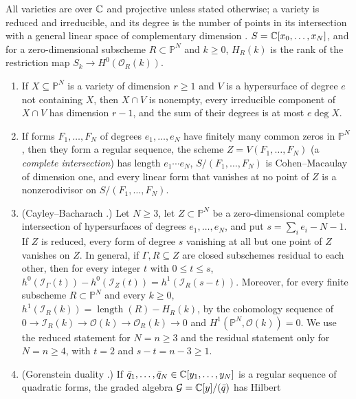 All varieties are over $\mathbb C$ and projective unless stated otherwise; a variety
is reduced and irreducible, and its degree is the number of points in its
intersection with a general linear space of complementary dimension
\cite{Harris1992}. $S=\mathbb C[x_0,\ldots,x_N]$, and for a
zero-dimensional subscheme $R\subset\mathbb P^N$ and $k\ge0$,
$H_R(k)$ is the rank of the restriction map $S_k\to H^0(\mathcal O_R(k))$.
\begin{enumerate}[label=(AG\arabic*)]
\item \cite[Propositions~I.7.1, I.7.2 and Theorem~I.7.7]{Hartshorne1977} If
  $X\subseteq\mathbb P^N$ is a variety of dimension $r\ge1$ and $V$ is a
  hypersurface of degree $e$ not containing $X$, then $X\cap V$ is nonempty,
  every irreducible component of $X\cap V$ has dimension $r-1$, and the sum
  of their degrees is at most $e\deg X$.
\item \cite[Proposition~8.4 and Example~8.4.6]{Fulton1998} If forms
  $F_1,\ldots,F_N$ of degrees $e_1,\ldots,e_N$ have finitely many common zeros
  in $\mathbb P^N$, then they form a regular sequence, the scheme
  $Z=V(F_1,\ldots,F_N)$ (a \emph{complete intersection}) has length
  $e_1\cdots e_N$, $S/(F_1,\ldots,F_N)$ is Cohen--Macaulay of dimension one, and
  every linear form that vanishes at no point of $Z$ is a nonzerodivisor on
  $S/(F_1,\ldots,F_N)$.
\item (Cayley--Bacharach \cite[Theorem~CB7]{EisenbudGreenHarris1996}.)
  Let $N\ge3$, let $Z\subset\mathbb P^N$ be a zero-dimensional complete
  intersection of hypersurfaces of degrees $e_1,\ldots,e_N$, and put
  $s=\sum_ie_i-N-1$. If $Z$ is reduced, every form of degree $s$ vanishing at
  all but one point of $Z$ vanishes on $Z$. In general, if $\Gamma,R\subseteq Z$
  are closed subschemes residual to each other, then for every integer $t$
  with $0\le t\le s$,
  $h^0(\mathcal I_\Gamma(t))-h^0(\mathcal I_Z(t))=h^1(\mathcal I_R(s-t))$.
  Moreover, for every finite subscheme $R\subset\mathbb P^N$ and every
  $k\ge0$, $h^1(\mathcal I_R(k))=\operatorname{length}(R)-H_R(k)$, by the
  cohomology sequence of
  $0\to\mathcal I_R(k)\to\mathcal O(k)\to\mathcal O_R(k)\to0$ and
  $H^1(\mathbb P^N,\mathcal O(k))=0$. We use the reduced statement for
  $N=n\ge3$ and the residual statement only for $N=n\ge4$, with $t=2$ and
  $s-t=n-3\ge1$.
\item (Gorenstein duality \cite[Chapter~21]{Eisenbud1995}.) If
  $\bar q_1,\ldots,\bar q_N\in\mathbb C[y_1,\ldots,y_N]$ is a regular sequence of
  quadratic forms, the graded algebra $\mathcal G=\mathbb C[y]/(\bar q)$ has Hilbert

\end{enumerate}
